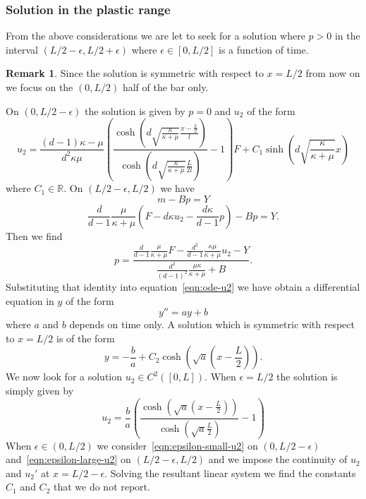 \documentclass[a4paper,10pt,oneside]{amsbook}
\numberwithin{section}{chapter}
\numberwithin{equation}{chapter}
\theoremstyle{definition}
\newtheorem{rmk}[prop]{Remark}
\begin{document}
\subsubsection*{Solution in the plastic range}

From the above considerations we are let to seek for a solution where $p>0$ in the interval $(L/2-\epsilon,L/2+\epsilon)$ where $\epsilon\in[0,L/2]$ is a function of time.
\begin{rmk}
Since the solution is symmetric with respect to $x=L/2$ from now on we focus on the $(0,L/2)$ half of the bar only.
\end{rmk}
On $(0,L/2-\epsilon)$ the solution is given by $p=0$ and $u_2$ of the form
\begin{equation}
\label{eqn:epsilon-small-u2}
u_2=\frac{(d-1)\kappa-\mu}{d^2\kappa\mu}\left(\frac{\cosh\left(d\sqrt{\frac{\kappa}{\kappa+\mu}}\frac{x-\frac{L}{2}}{l}\right)}{\cosh\left(d\sqrt{\frac{\kappa}{\kappa+\mu}}\frac{L}{2l}\right)}-1\right)F+C_1\sinh\left(d\sqrt{\frac{\kappa}{\kappa+\mu}}x\right)
\end{equation}
where $C_1\in\mathbb{R}$. On $(L/2-\epsilon,L/2)$ we have
\[
m-Bp=Y
\]
\[
\frac{d}{d-1}\frac{\mu}{\kappa+\mu}(F-d\kappa u_2-\frac{d\kappa}{d-1}p)-Bp=Y.
\]
Then we find
\begin{equation*}
\label{eqn:p-as-function-of-y}
p=\frac{\frac{d}{d-1}\frac{\mu}{\kappa+\mu}F-\frac{d^2}{d-1}\frac{\kappa\mu}{\kappa+\mu}u_2-Y}{\frac{d^2}{(d-1)^2}\frac{\mu\kappa}{\kappa+\mu}+B}.
\end{equation*}
Substituting that identity into equation~\eqref{eqn:ode-u2} we have obtain a differential equation in $y$ of the form
\[
y''=ay+b
\]
where $a$ and $b$ depends on time only. A solution which is symmetric with respect to $x=L/2$ is of the form
\begin{equation}
\label{eqn:epsilon-large-u2}
y=-\frac{b}{a}+C_2\cosh\left(\sqrt{a}\left(x-\frac{L}{2}\right)\right).
\end{equation}
We now look for a solution $u_2\in C^2([0,L])$. When $\epsilon=L/2$ the solution is simply given by
\[
u_2=\frac{b}{a}\left(\frac{\cosh\left(\sqrt{a}\left(x-\frac{L}{2}\right)\right)}{\cosh\left(\sqrt{a}\frac{L}{2}\right)}-1\right)
\]
When $\epsilon\in(0,L/2)$ we consider~\eqref{eqn:epsilon-small-u2} on $(0,L/2-\epsilon)$ and~\eqref{eqn:epsilon-large-u2} on $(L/2-\epsilon,L/2)$ and we impose the continuity of $u_2$ and $u_2'$ at $x=L/2-\epsilon$. Solving the resultant linear system we find the constants $C_1$ and $C_2$ that we do not report.
\end{document}
